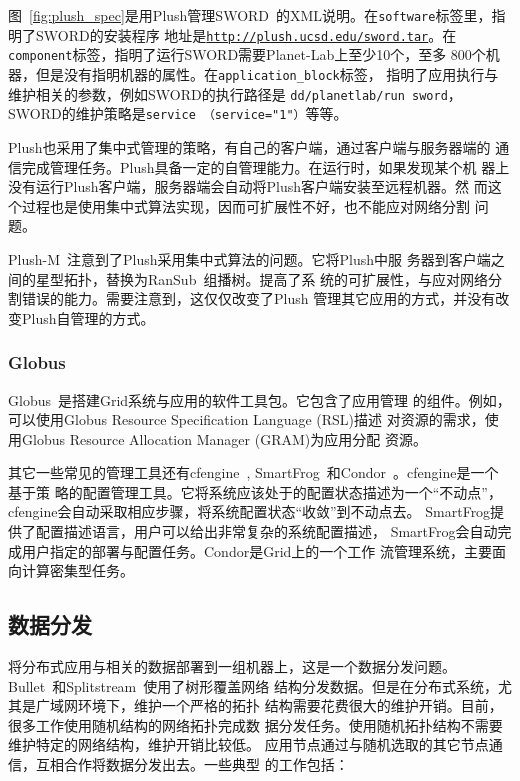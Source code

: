 图~\ref{fig:plush_spec}是用Plush管理SWORD~\cite{sword_worlds,
sword_toit}的XML说明。在\texttt{software}标签里，指明了SWORD的安装程序
地址是\texttt{\url{http://plush.ucsd.edu/sword.tar}}。在
\texttt{component}标签，指明了运行SWORD需要Planet-Lab上至少10个，至多
800个机器，但是没有指明机器的属性。在\texttt{application\_block}标签，
指明了应用执行与维护相关的参数，例如SWORD的执行路径是
\texttt{dd\-/planetlab\-/run sword}，SWORD的维护策略是\texttt{service
（service="1"）}等等。

Plush也采用了集中式管理的策略，有自己的客户端，通过客户端与服务器端的
通信完成管理任务。Plush具备一定的自管理能力。在运行时，如果发现某个机
器上没有运行Plush客户端，服务器端会自动将Plush客户端安装至远程机器。然
而这个过程也是使用集中式算法实现，因而可扩展性不好，也不能应对网络分割
问题。

Plush-M~\cite{plush-m}注意到了Plush采用集中式算法的问题。它将Plush中服
务器到客户端之间的星型拓扑，替换为RanSub~\cite{ransub}组播树。提高了系
统的可扩展性，与应对网络分割错误的能力。需要注意到，这仅仅改变了Plush
管理其它应用的方式，并没有改变Plush自管理的方式。

\subsubsection*{Globus}

Globus~\cite{globus}是搭建Grid系统与应用的软件工具包。它包含了应用管理
的组件。例如，可以使用Globus Resource Specification Language (RSL)描述
对资源的需求，使用Globus Resource Allocation Manager (GRAM)为应用分配
资源。

其它一些常见的管理工具还有cfengine~\cite{cfengine},
SmartFrog~\cite{smartfrog}和Condor~\cite{condor}。cfengine是一个基于策
略的配置管理工具。它将系统应该处于的配置状态描述为一个“不动点”，
cfengine会自动采取相应步骤，将系统配置状态“收敛”到不动点去。
SmartFrog提供了配置描述语言，用户可以给出非常复杂的系统配置描述，
SmartFrog会自动完成用户指定的部署与配置任务。Condor是Grid上的一个工作
流管理系统，主要面向计算密集型任务。




\subsection{数据分发}

将分布式应用与相关的数据部署到一组机器上，这是一个数据分发问题。
Bullet~\cite{bullet}和Splitstream~\cite{splitstream}使用了树形覆盖网络
结构分发数据。但是在分布式系统，尤其是广域网环境下，维护一个严格的拓扑
结构需要花费很大的维护开销。目前，很多工作使用随机结构的网络拓扑完成数
据分发任务。使用随机拓扑结构不需要维护特定的网络结构，维护开销比较低。
应用节点通过与随机选取的其它节点通信，互相合作将数据分发出去。一些典型
的工作包括：

